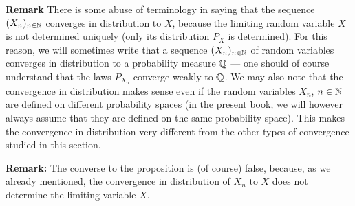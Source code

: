 \documentclass[../Main.tex]{subfiles}
\begin{document}
\textbf{Remark}
There is some abuse of terminology in saying that the sequence $(X_n)_{n\in\mathbb{N}}$ converges in distribution to $X$, because the limiting random variable $X$ is not determined uniquely (only its distribution $P_X$ is determined). For this reason, we will sometimes write that a sequence $(X_n)_{n\in\mathbb{N}}$ of random variables converges in distribution to a probability measure $\mathbb{Q}$ --- one should of course understand that the laws $P_{X_n}$ converge weakly to $\mathbb{Q}$. We may also note that the convergence in distribution makes sense even if the random variables $X_n$, $n\in\mathbb{N}$ are defined on different probability spaces (in the present book, we will however always assume that they are defined on the same probability space). This makes the convergence in distribution very different from the other types of convergence studied in this section.



\textbf{Remark:} The converse to the proposition is (of course) false, because, as we already mentioned, the convergence in distribution of $X_n$ to $X$ does not determine the limiting variable $X$. 
\end{document}
